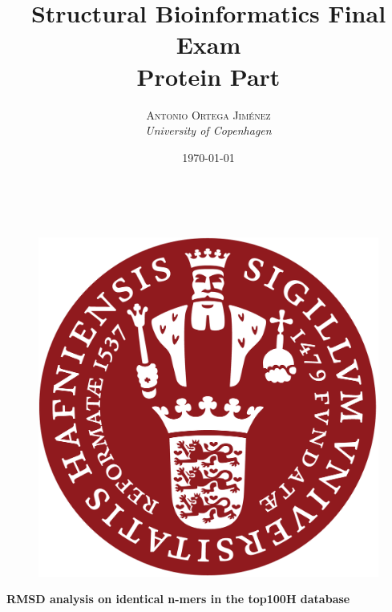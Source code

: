 \documentclass[a4paper, 11pt]{article} %
\title{\textbf{Structural Bioinformatics Final Exam}\\  %
\vspace{10pt}Protein Part} %
\author{\textsc{Antonio Ortega Jim\'enez} %
\\{\textit{University of Copenhagen}}} %
\date{\today} %
\makeatletter
\renewcommand{\maketitle}{ %
\begin{flushright} %
{\LARGE\@title} %

\vspace{50pt} %

{\large\@author} %
\\\@date %

\vspace{40pt} %
\end{flushright}
}
\makeatother
\begin{document}
\maketitle %
\thispagestyle{empty}

\vspace{-3.7cm}
\begin{figure}[!h]
\includegraphics[scale=0.35]{figures/ku_logo}
\end{figure}

\vspace{30pt}

\begin{center}
\Huge{\textbf{RMSD analysis on identical n-mers in the top100H database}}
\end{center}





\newpage
\end{document}
